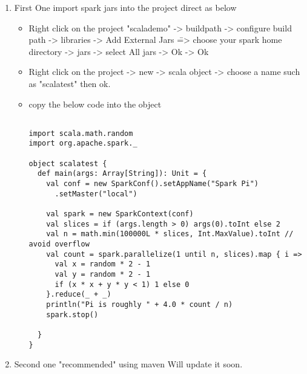 \documentclass[]{article}
\begin{document}
	\begin{enumerate}
	\item First One import spark jars into the project direct as below 
	\begin{itemize}
	\item Right click on the project "scalademo" -> buildpath -> configure build path -> libraries ->  Add External Jars \==> choose your spark home directory -> jars -> select All jars  -> Ok -> Ok
	\item Right click on the project -> new -> scala object -> choose a name such as "scalatest" then ok.
	\item copy the below code into the object
	




\begin{lstlisting}[style=myScalastyle]
	
import scala.math.random
import org.apache.spark._

object scalatest {
  def main(args: Array[String]): Unit = {
    val conf = new SparkConf().setAppName("Spark Pi")
      .setMaster("local")

    val spark = new SparkContext(conf)
    val slices = if (args.length > 0) args(0).toInt else 2
    val n = math.min(100000L * slices, Int.MaxValue).toInt // avoid overflow
    val count = spark.parallelize(1 until n, slices).map { i =>
      val x = random * 2 - 1
      val y = random * 2 - 1
      if (x * x + y * y < 1) 1 else 0
    }.reduce(_ + _)
    println("Pi is roughly " + 4.0 * count / n)
    spark.stop()

  }
}	
\end{lstlisting}
	
	\end{itemize}
\item Second one "recommended" using maven 
Will update it soon.
	\end{enumerate}
	
\end{document}
